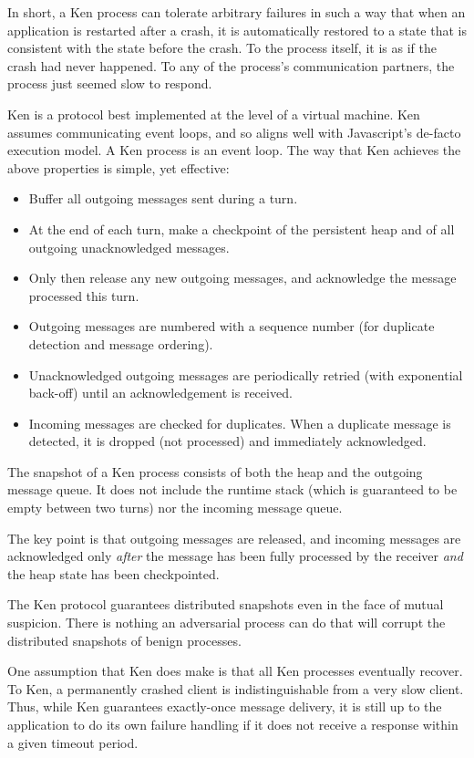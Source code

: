 \documentclass{llncs}
\begin{document}
In short, a Ken process can tolerate arbitrary failures in such a way that when an application is restarted after a crash, it is automatically restored to a state that is consistent with the state before the crash. To the process itself, it is as if the crash had never happened. To any of the process's communication partners, the process just seemed slow to respond.

Ken is a protocol best implemented at the level of a virtual machine. Ken assumes communicating event loops, and so aligns well with Javascript's de-facto execution model. A Ken process is an event loop. The way that Ken achieves the above properties is simple, yet effective:

\begin{itemize}
  \item Buffer all outgoing messages sent during a turn.
  \item At the end of each turn, make a checkpoint of the persistent heap and of all outgoing unacknowledged messages.
  \item Only then release any new outgoing messages, and acknowledge the message processed this turn.
  \item Outgoing messages are numbered with a sequence number (for duplicate detection and message ordering).
  \item Unacknowledged outgoing messages are periodically retried (with exponential back-off) until an acknowledgement is received.
  \item Incoming messages are checked for duplicates. When a duplicate message is detected, it is dropped (not processed) and immediately acknowledged.
\end{itemize}

The snapshot of a Ken process consists of both the heap and the outgoing message queue. It does not include the runtime stack (which is guaranteed to be empty between two turns) nor the incoming message queue.

The key point is that outgoing messages are released, and incoming messages are acknowledged only \emph{after} the message has been fully processed by the receiver \emph{and} the heap state has been checkpointed.

The Ken protocol guarantees distributed snapshots even in the face of mutual suspicion. There is nothing an adversarial process can do that will corrupt the distributed snapshots of benign processes.

One assumption that Ken does make is that all Ken processes eventually recover. To Ken, a permanently crashed client is indistinguishable from a very slow client. Thus, while Ken guarantees exactly-once message delivery, it is still up to the application to do its own failure handling if it does not receive a response within a given timeout period.
\end{document}
